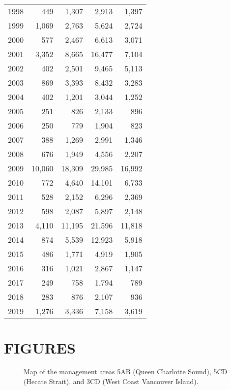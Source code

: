 \documentclass[11pt]{book}
\begin{document}
\begin{longtable}[]{@{}lrrrr@{}}
1998 & 449 & 1,307 & 2,913 & 1,397\tabularnewline
1999 & 1,069 & 2,763 & 5,624 & 2,724\tabularnewline
2000 & 577 & 2,467 & 6,613 & 3,071\tabularnewline
2001 & 3,352 & 8,665 & 16,477 & 7,104\tabularnewline
2002 & 402 & 2,501 & 9,465 & 5,113\tabularnewline
2003 & 869 & 3,393 & 8,432 & 3,283\tabularnewline
2004 & 402 & 1,201 & 3,044 & 1,252\tabularnewline
2005 & 251 & 826 & 2,133 & 896\tabularnewline
2006 & 250 & 779 & 1,904 & 823\tabularnewline
2007 & 388 & 1,269 & 2,991 & 1,346\tabularnewline
2008 & 676 & 1,949 & 4,556 & 2,207\tabularnewline
2009 & 10,060 & 18,309 & 29,985 & 16,992\tabularnewline
2010 & 772 & 4,640 & 14,101 & 6,733\tabularnewline
2011 & 528 & 2,152 & 6,296 & 2,369\tabularnewline
2012 & 598 & 2,087 & 5,897 & 2,148\tabularnewline
2013 & 4,110 & 11,195 & 21,596 & 11,818\tabularnewline
2014 & 874 & 5,539 & 12,923 & 5,918\tabularnewline
2015 & 486 & 1,771 & 4,919 & 1,905\tabularnewline
2016 & 316 & 1,021 & 2,867 & 1,147\tabularnewline
2017 & 249 & 758 & 1,794 & 789\tabularnewline
2018 & 283 & 876 & 2,107 & 936\tabularnewline
2019 & 1,276 & 3,336 & 7,158 & 3,619\tabularnewline
\bottomrule
\end{longtable}
\clearpage

\clearpage

\hypertarget{figures}{%
\section{FIGURES}\label{figures}}
\begin{figure}[htb]

{\centering {} 

}

\caption{Map of the management areas 5AB (Queen Charlotte Sound), 5CD (Hecate Strait), and 3CD (West Coast Vancouver Island).}\label{fig:fig-map}
\end{figure}
\clearpage
\end{document}
